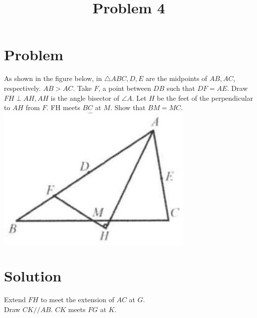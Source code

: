 \documentclass{article}
\title{Problem 4}
\date{}
\begin{document}
\maketitle

\section*{Problem}
As shown in the figure below, in \(\triangle A B C, D, E\) are the midpoints of \(A B, A C\), respectively. \(A B>A C\). Take \(F\), a point between \(D B\) such that \(D F=A E\). Draw \(F H \perp A H, A H\) is the angle bisector of \(\angle A\). Let \(H\) be the feet of the perpendicular to \(A H\) from \(F\). FH meets \(B C\) at \(M\). Show that \(B M=M C\).\\
\centering
\includegraphics[width=\textwidth]{images/problem_image_1.jpg}

\section*{Solution}
Extend \(F H\) to meet the extension of \(A C\) at \(G\).\\
Draw \(C K / / A B\). \(C K\) meets \(F G\) at \(K\).
\end{document}
